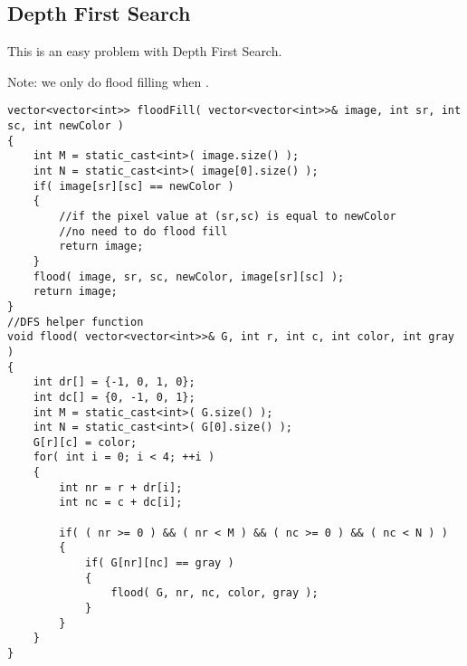 \subsection{Depth First Search}
This is an easy problem with Depth First Search.

Note: we only do flood filling when .

\setcounter{lstlisting}{0}
\begin{lstlisting}[style=customc, caption={Depth First Search}]
vector<vector<int>> floodFill( vector<vector<int>>& image, int sr, int sc, int newColor )
{
    int M = static_cast<int>( image.size() );
    int N = static_cast<int>( image[0].size() );
    if( image[sr][sc] == newColor )
    {
        //if the pixel value at (sr,sc) is equal to newColor
        //no need to do flood fill
        return image;
    }
    flood( image, sr, sc, newColor, image[sr][sc] );
    return image;
}
//DFS helper function
void flood( vector<vector<int>>& G, int r, int c, int color, int gray )
{
    int dr[] = {-1, 0, 1, 0};
    int dc[] = {0, -1, 0, 1};
    int M = static_cast<int>( G.size() );
    int N = static_cast<int>( G[0].size() );
    G[r][c] = color;
    for( int i = 0; i < 4; ++i )
    {
        int nr = r + dr[i];
        int nc = c + dc[i];

        if( ( nr >= 0 ) && ( nr < M ) && ( nc >= 0 ) && ( nc < N ) )
        {
            if( G[nr][nc] == gray )
            {
                flood( G, nr, nc, color, gray );
            }
        }
    }
}
\end{lstlisting}